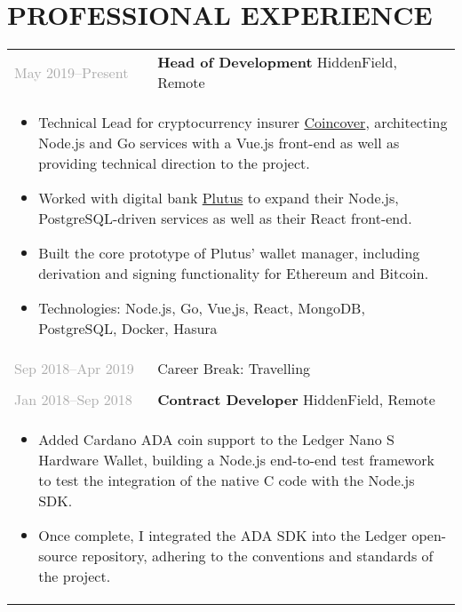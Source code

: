 \documentclass{article}
\newenvironment{exptable}{
  \begin{longtable}{lp{0.8\textwidth}}
  }{
  \end{longtable}
}
\begin{document}
  \section*{PROFESSIONAL EXPERIENCE}
    \begin{exptable}
      \textcolor{darkgray}{May 2019--Present}  & \textbf{Head of Development} HiddenField, Remote \\
      \multicolumn{2}{p{\textwidth}}{
        \begin{itemize}
          \item Technical Lead for cryptocurrency insurer \href{https://www.coincover.com}{Coincover}, architecting Node.js and Go services with a Vue.js front-end as well as providing technical direction to the project.
          \item Worked with digital bank \href{https://plutus.it}{Plutus} to expand their Node.js, PostgreSQL-driven services as well as their React front-end.
          \item Built the core prototype of Plutus' wallet manager, including derivation and signing functionality for Ethereum and Bitcoin.
        \end{itemize}

        \vspace{1em}

        \begin{itemize}[leftmargin=1em]
          \item[] Technologies: Node.js, Go, Vue,js, React, MongoDB, PostgreSQL, Docker, Hasura
        \end{itemize}
      } \\

      \textcolor{darkgray}{Sep 2018--Apr 2019} & Career Break: Travelling \\
      \multicolumn{2}{p{\textwidth}}{} \\

      \textcolor{darkgray}{Jan 2018--Sep 2018} & \textbf{Contract Developer} HiddenField, Remote \\
      \multicolumn{2}{p{\textwidth}}{
        \begin{itemize}
          \item Added Cardano ADA coin support to the Ledger Nano S Hardware Wallet, building a Node.js end-to-end test framework to test the integration of the native C code with the Node.js SDK.
          \item Once complete, I integrated the ADA SDK into the Ledger open-source repository, adhering to the conventions and standards of the project.
        \end{itemize}

}
\end{exptable}
\end{document}
